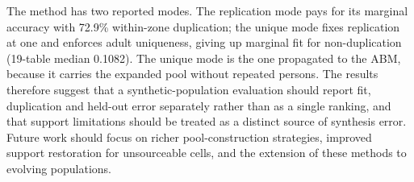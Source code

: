 \documentclass[review]{elsarticle}
\begin{document}
The method has two reported modes. The replication mode pays for its marginal accuracy with 72.9\% within-zone duplication; the unique mode fixes replication at one and enforces adult uniqueness, giving up marginal fit for non-duplication (19-table median 0.1082). The unique mode is the one propagated to the ABM, because it carries the expanded pool without repeated persons. The results therefore suggest that a synthetic-population evaluation should report fit, duplication and held-out error separately rather than as a single ranking, and that support limitations should be treated as a distinct source of synthesis error. Future work should focus on richer pool-construction strategies, improved support restoration for unsourceable cells, and the extension of these methods to evolving populations.
\end{document}
